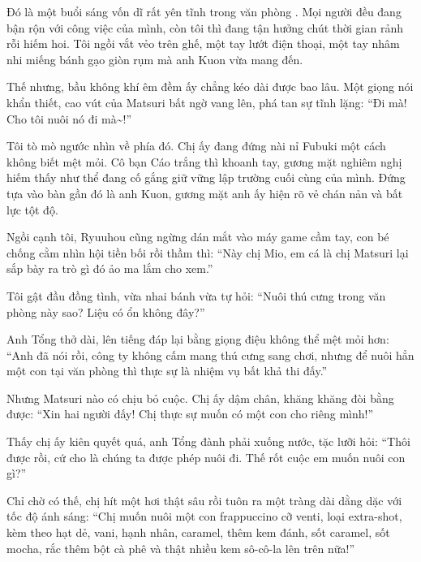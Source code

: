 \documentclass[../main.tex]{subfiles}
\begin{document}


Đó là một buổi sáng vốn dĩ rất yên tĩnh trong văn phòng \hll. Mọi người đều đang bận rộn với công việc của mình, còn tôi thì đang tận hưởng chút thời gian rảnh rỗi hiếm hoi. Tôi ngồi vắt vẻo trên ghế, một tay lướt điện thoại, một tay nhâm nhi miếng bánh gạo giòn rụm mà anh Kuon vừa mang đến.


Thế nhưng, bầu không khí êm đềm ấy chẳng kéo dài được bao lâu. Một giọng nói khẩn thiết, cao vút của Matsuri bất ngờ vang lên, phá tan sự tĩnh lặng: ``Đi mà! Cho tôi nuôi nó đi mà\~{}!''

Tôi tò mò ngước nhìn về phía đó. Chị ấy đang đứng nài nỉ Fubuki một cách không biết mệt mỏi. Cô bạn Cáo trắng thì khoanh tay, gương mặt nghiêm nghị hiếm thấy như thể đang cố gắng giữ vững lập trường cuối cùng của mình. Đứng tựa vào bàn gần đó là anh Kuon, gương mặt anh ấy hiện rõ vẻ chán nản và bất lực tột độ.

Ngồi cạnh tôi, Ryuuhou cũng ngừng dán mắt vào máy game cầm tay, con bé chống cằm nhìn hội tiền bối rồi thầm thì: ``Này chị Mio, em cá là chị Matsuri lại sắp bày ra trò gì đó ảo ma lắm cho xem.''

Tôi gật đầu đồng tình, vừa nhai bánh vừa tự hỏi: ``Nuôi thú cưng trong văn phòng này sao? Liệu có ổn không đây?''

Anh Tổng thở dài, lên tiếng đáp lại bằng giọng điệu không thể mệt mỏi hơn: ``Anh đã nói rồi, công ty không cấm mang thú cưng sang chơi, nhưng để nuôi hẳn một con tại văn phòng thì thực sự là nhiệm vụ bất khả thi đấy.''

Nhưng Matsuri nào có chịu bỏ cuộc. Chị ấy dậm chân, khăng khăng đòi bằng được: ``Xin hai người đấy! Chị thực sự muốn có một con cho riêng mình!''

Thấy chị ấy kiên quyết quá, anh Tổng đành phải xuống nước, tặc lưỡi hỏi: ``Thôi được rồi, cứ cho là chúng ta được phép nuôi đi. Thế rốt cuộc em muốn nuôi con gì?''

Chỉ chờ có thế, chị hít một hơi thật sâu rồi tuôn ra một tràng dài dằng dặc với tốc độ ánh sáng: ``Chị muốn nuôi một con frappuccino cỡ venti, loại extra-shot, kèm theo hạt dẻ, vani, hạnh nhân, caramel, thêm kem đánh, sốt caramel, sốt mocha, rắc thêm bột cà phê và thật nhiều kem sô-cô-la lên trên nữa!''
\end{document}
